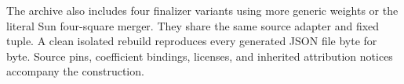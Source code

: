 The archive also includes four finalizer variants using more generic
weights or the literal Sun four-square merger.  They share the same
source adapter and fixed tuple.  A clean isolated rebuild reproduces
every generated JSON file byte for byte.  Source pins, coefficient
bindings, licenses, and inherited attribution notices accompany
the construction.
